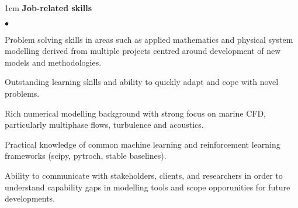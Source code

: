 \documentclass[a4paper,10pt]{article}
\newcommand{\squishlist}{
	\begin{list}{$\bullet$}
	{
		\setlength{\itemsep}{0pt}
		\setlength{\parsep}{0pt}
		\setlength{\topsep}{0pt}
		\setlength{\partopsep}{0pt}
		\setlength{\leftmargin}{2em}
		\setlength{\labelwidth}{1.5em}
		\setlength{\labelsep}{0.5em}
	}
}
\newcommand{\squishend}{\end{list}}
\begin{document}
\begin{minipage}{\textwidth}
\begin{adjustwidth}{}{1cm}
\textbf{Job-related skills}
\squishlist
	\item Problem solving skills in areas such as applied mathematics and physical system modelling
		derived from multiple projects centred around development of new models and methodologies.
	\item Outstanding learning skills and ability to quickly adapt and cope with novel problems.
    \item Rich numerical modelling background with strong focus on marine CFD, particularly
        multiphase flows, turbulence and acoustics.
	\item Practical knowledge of common machine learning and reinforcement learning frameworks (scipy, pytroch, stable baselines).
	\item Ability to communicate with stakeholders, clients, and researchers in order to understand capability gaps in modelling tools and scope opporunities for future developments.
\squishend


\end{adjustwidth}
\end{minipage}
\end{document}
